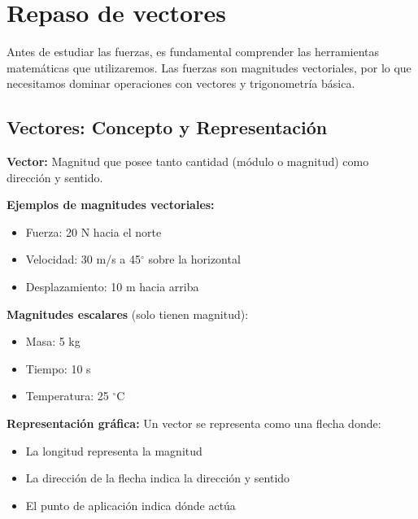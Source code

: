 \renewcommand{\tema}{Lección: Dinámica}

\section{Repaso de vectores}

\begin{seccion}
Antes de estudiar las fuerzas, es fundamental comprender las herramientas matemáticas que utilizaremos. Las fuerzas son magnitudes vectoriales, por lo que necesitamos dominar operaciones con vectores y trigonometría básica.
\end{seccion}

\subsection{Vectores: Concepto y Representación}

\begin{seccion}
\begin{definicion}
    \textbf{Vector:} Magnitud que posee tanto cantidad (módulo o magnitud) como dirección y sentido.
\end{definicion}

\textbf{Ejemplos de magnitudes vectoriales:}
\begin{itemize}
    \item Fuerza: 20 N hacia el norte
    \item Velocidad: 30 m/s a 45$^\circ$ sobre la horizontal
    \item Desplazamiento: 10 m hacia arriba
\end{itemize}

\textbf{Magnitudes escalares} (solo tienen magnitud):
\begin{itemize}
    \item Masa: 5 kg
    \item Tiempo: 10 s
    \item Temperatura: 25 $^\circ$C
\end{itemize}

\vspace{0.3cm}

\textbf{Representación gráfica:} Un vector se representa como una flecha donde:
\begin{itemize}
    \item La longitud representa la magnitud
    \item La dirección de la flecha indica la dirección y sentido
    \item El punto de aplicación indica dónde actúa
\end{itemize}
\end{seccion}

